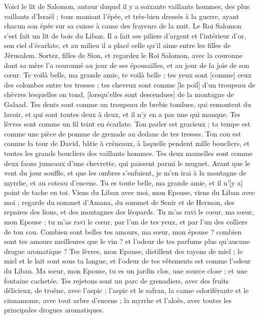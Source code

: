 \begin{multicols}{2}
Voici le lit de Salomon, autour duquel il y a soixante vaillants hommes, des plus vaillants d'Israël ;
tous maniant l'épée, et très-bien dressés à la guerre, ayant chacun son épée sur sa cuisse à cause des frayeurs de la nuit.
Le Roi Salomon s'est fait un lit de bois du Liban.
Il a fait ses piliers d'argent et l'intérieur d'or, son ciel d'écarlate, et au milieu il a placé celle qu'il aime entre les filles de Jérusalem.
Sortez, filles de Sion, et regardez le Roi Salomon, avec la couronne dont sa mère l'a couronné au jour de ses épousailles, et au jour de la joie de son cœur.
\VerseOne{}Te voilà belle, ma grande amie, te voilà belle ; tes yeux sont [comme] ceux des colombes entre tes tresses ; tes cheveux sont comme [le poil] d'un troupeau de chèvres lesquelles on tond, [lorsqu'elles sont descendues] de la montagne de Galaad.
Tes dents sont comme un troupeau de brebis tondues, qui remontent du lavoir, et qui sont toutes deux à deux, et il n'y en a pas une qui manque.
Tes lèvres sont comme un fil teint en écarlate. Ton parler est gracieux ; ta tempe est comme une pièce de pomme de grenade au dedans de tes tresses.
Ton cou est comme la tour de David, bâtie à créneaux, à laquelle pendent mille boucliers, et toutes les grands boucliers des vaillants hommes.
Tes deux mamelles sont comme deux faons jumeaux d'une chevrette, qui paissent parmi le muguet.
Avant que le vent du jour souffle, et que les ombres s'enfuient, je m'en irai à la montagne de myrrhe, et au coteau d'encens.
Tu es toute belle, ma grande amie, et il n'[y a] point de tache en toi.
Viens du Liban avec moi, mon Epouse, viens du Liban avec moi ; regarde du sommet d'Amana, du sommet de Senir et de Hermon, des repaires des lions, et des montagnes des léopards.
Tu m'as ravi le cœur, ma sœur, mon Epouse ; tu m'as ravi le cœur, par l'un de tes yeux, et par l'un des colliers de ton cou.
Combien sont belles tes amours, ma sœur, mon épouse ? combien sont tes amours meilleures que le vin ? et l'odeur de tes parfums plus qu'aucune drogue aromatique ?
Tes lèvres, mon Epouse, distillent des rayons de miel ; le miel et le lait sont sous ta langue, et l'odeur de tes vêtements est comme l'odeur du Liban.
Ma sœur, mon Epouse, tu es un jardin clos, une source close ; et une fontaine cachetée.
Tes rejetons sont un parc de grenadiers, avec des fruits délicieux, de troëne, avec l'aspic ;
l'aspic et le safran, la canne odoriférante et le cinnamome, avec tout arbre d'encens ; la myrrhe et l'aloès, avec toutes les principales drogues aromatiques.

\end{multicols}
